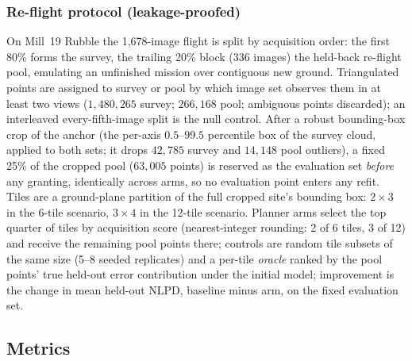 \subsubsection{Re-flight protocol (leakage-proofed)}
 On Mill~19 Rubble the 1{,}678-image flight is split by acquisition
order: the first 80\% forms the survey, the trailing 20\% block (336
images) the held-back re-flight pool, emulating an unfinished mission
over contiguous new ground. Triangulated points are assigned to survey
or pool by which image set observes them in at least two views
($1{,}480{,}265$ survey; $266{,}168$ pool; ambiguous points discarded);
an interleaved every-fifth-image split is the null control. After a
robust bounding-box crop of the anchor (the per-axis $0.5$--$99.5$
percentile box of the survey cloud, applied to both sets; it drops
$42{,}785$ survey and
$14{,}148$ pool outliers), a fixed 25\% of the cropped pool
($63{,}005$ points) is reserved as the evaluation set \emph{before}
any granting, identically across arms, so no evaluation point enters
any refit. Tiles are a ground-plane partition of the full cropped
site's bounding box: $2\times3$ in the 6-tile scenario, $3\times4$ in
the 12-tile scenario. Planner arms
select the top quarter of tiles by acquisition score
(nearest-integer rounding: 2 of 6 tiles, 3 of 12) and
receive the remaining pool points there; controls are random
tile subsets of the same size (5--8 seeded replicates) and a per-tile
\emph{oracle} ranked by the pool points' true held-out error
contribution under the initial model; improvement is the change in mean
held-out NLPD, baseline minus arm, on the fixed evaluation set.

\subsection{Metrics}
\label{sec:setup:metrics}

